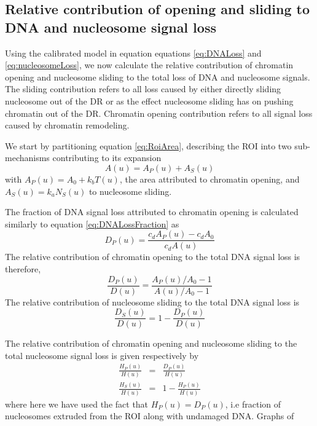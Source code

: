 \documentclass[12pt]{article}
\begin{document}
\subsection{Relative contribution of opening and sliding to DNA
	and nucleosome signal loss}

Using the calibrated model in equation equations \eqref{eq:DNALoss} and \eqref{eq:nucleosomeLoss}, we now calculate the
relative contribution of chromatin opening and nucleosome sliding to the
total loss of DNA and nucleosome signals. The sliding contribution refers to all loss
caused by either directly sliding nucleosome out of the DR or as the effect
nucleosome sliding has on pushing chromatin out of the DR. Chromatin opening contribution refers to all signal loss caused by chromatin remodeling.

We start by partitioning equation \eqref{eq:RoiArea}, describing the ROI into two sub-mechanisms contributing to its expansion 
\begin{equation*}
A(u) = A_P(u) +A_S(u)
\end{equation*}
with $A_P(u)=A_0+k_bT(u)$, the area attributed to chromatin opening, and $A_S(u)=k_aN_S(u)$ to nucleosome sliding. 

The fraction of DNA signal loss attributed to chromatin opening is calculated similarly to equation \eqref{eq:DNALossFraction} as 
\begin{equation*}
D_P(u)=\frac{c_dA_P(u)-c_dA_0}{c_dA(u)}
\end{equation*}
The relative contribution of chromatin opening to the total DNA signal loss is therefore,
\begin{equation}\label{eq:relativeOpeningDNA}
\frac{D_P(u)}{D(u)}=\frac{A_P(u)/A_0-1}{A(u)/A_0-1}
\end{equation}	
The relative contribution of nucleosome sliding to the total DNA signal loss is
\begin{equation}\label{eq:relativeSlidingDNA}
\frac{D_S(u)}{D(u)}=1-\frac{D_P(u)}{D(u)}
\end{equation}

The relative contribution of chromatin opening and nucleosome
sliding to the total nucleosome signal loss is given respectively by
\begin{eqnarray}
\frac{H_P(u)}{H(u)} &=& \frac{D_P(u)}{H(u)}\label{eq:relativeOpeningNucleosomes}\\
\frac{H_S(u)}{H(u)} &=&1-\frac{H_P(u)}{H(u)} \label{eq:relativeSlidingNucleosomes}
\end{eqnarray}
where here we have used the fact that $H_P(u) = D_P(u)$, i.e fraction of nucleosomes extruded from the ROI along with undamaged DNA. Graphs of
\end{document}
